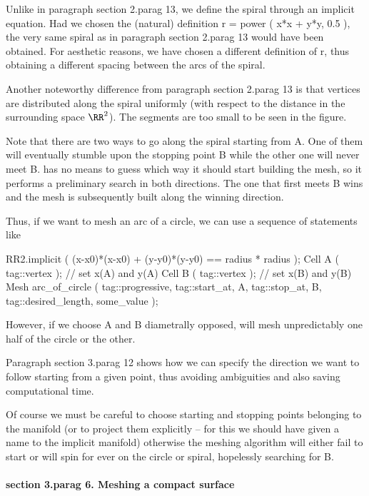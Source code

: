 Unlike in paragraph \numb section 2.\numb parag 13, we define the spiral through an implicit
equation.
Had we chosen the (natural) definition {\codett r = power ( x*x + y*y, 0.5 )},
the very same spiral as in paragraph \numb section 2.\numb parag 13 would have been obtained.
For aesthetic reasons, we have chosen a different definition of {\codett r}, thus obtaining
a different spacing between the arcs of the spiral.

Another noteworthy difference from paragraph \numb section 2.\numb parag 13 is that vertices
are distributed along the spiral uniformly (with respect to the distance in the surrounding
space $ \RR^2 $).
The segments are too small to be seen in the figure.

Note that there are two ways to go along the spiral starting from {\codett A}.
One of them will eventually stumble upon the stopping point {\codett B} while
the other one will never meet {\codett B}.
{\ManiFEM} has no means to guess which way it should start building the mesh,
so it performs a preliminary search in both directions.
The one that first meets {\codett B} wins and the mesh is subsequently built along
the winning direction.

Thus, if we want to mesh an arc of a circle, we can use a sequence of statements like

\verbatim
   RR2.implicit ( (x-x0)*(x-x0) + (y-y0)*(y-y0) == radius * radius );
   Cell A ( tag::vertex );  // set x(A) and y(A)
   Cell B ( tag::vertex );  // set x(B) and y(B)
   Mesh arc_of_circle ( tag::progressive, tag::start_at, A,
                        tag::stop_at, B, tag::desired_length, some_value );
\endverbatim

However, if we choose {\codett A} and {\codett B} diametrally opposed, {\maniFEM} will
mesh unpredictably one half of the circle or the other.

Paragraph \numb section 3.\numb parag 12 shows how we can specify the direction we
want to follow starting from a given point, thus avoiding ambiguities and also saving
computational time.

Of course we must be careful to choose starting and stopping points belonging to the manifold
(or to {\codett project} them explicitly -- for this we should have given a name to the
implicit manifold) otherwise the meshing algorithm will either fail to start or will spin
for ever on the circle or spiral, hopelessly searching for {\codett B}.


\paragraph{\numb section 3.\numb parag 6. Meshing a compact surface}

